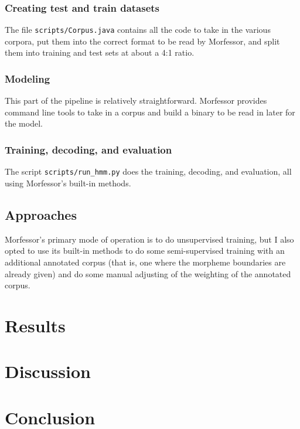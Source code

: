 \documentclass[10pt]{article}
\begin{document}
\subsubsection{Creating test and train datasets}
The file \texttt{scripts/Corpus.java} contains all the code to take in the various corpora, put them into the correct format to be read by Morfessor, and split them into training and test sets at about a 4:1 ratio.

\subsubsection{Modeling}
This part of the pipeline is relatively straightforward. Morfessor provides command line tools to take in a corpus and build a binary to be read in later for the model.

\subsubsection{Training, decoding, and evaluation}
The script \texttt{scripts/run\_hmm.py} does the training, decoding, and evaluation, all using Morfessor's built-in methods.

\subsection{Approaches}
Morfessor's primary mode of operation is to do unsupervised training, but I also opted to use its built-in methods to do some semi-supervised training with an additional annotated corpus (that is, one where the morpheme boundaries are already given) and do some manual adjusting of the weighting of the annotated corpus.

\section{Results}

\section{Discussion}

\section{Conclusion}

\pagebreak


\end{document}
